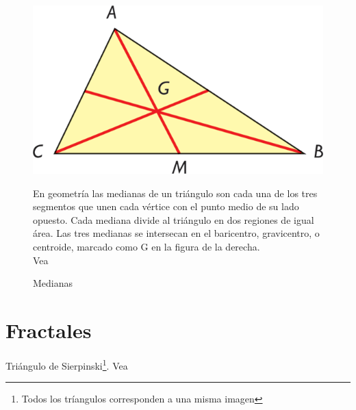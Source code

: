 \documentclass[letterpaper,12pt]{article}
\begin{document}
\begin{figure}[h!]
	\begin{minipage}{6cm}
	 	\centering
	    \includegraphics[scale=0.31]{medianas}
         \caption{Medianas}
    \end{minipage}
    \hspace{1.5cm}
    \begin{minipage}{10cm}
   	 En geometría las medianas de un triángulo son cada una de los tres segmentos que unen cada vértice 
	con el punto medio de su lado opuesto. Cada mediana divide al triángulo en dos regiones de igual área.
	Las tres medianas se intersecan en el baricentro, gravicentro, o centroide, marcado como G en la figura de 	la derecha. \\Vea \cite[cap. 6]{Relaciones y Geometria Analitica}
    \end{minipage}
\end{figure}

\section{Fractales}
Triángulo de Sierpinski\footnote{Todos los tríangulos corresponden a una misma imagen}. Vea \cite[2003]{Fractales y Cosas Raras}
\end{document}

